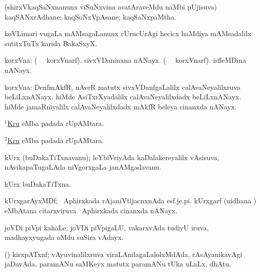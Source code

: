 \bentry
{}
\gl{\nA}
\bmng
(shirxVkaqSaNxnanunx viSuNxvina avatAraveMdu naMbi pUjisuva) kaqSANxrAdhane; kaqSoNxVpAsane; kaqSaNxpaMtha. 
\emng
\eentry

\bentry
{}
\gl{\nA}
\bmng
koVLimari \mo vugaLa mAMsagaLanunx cUrucUrAgi hecicx haMdiya mAMsadalilx sutitxTuTx karida BakaSxyX. 
\emng
\eentry

\bentry
{}
\gl{\nA}
\bmng
korxVna: 
\banum
{} (\bava\  \ucAcx\ korxVnarf). sivxVDaninxna nANayx. 
 (\bava\  \ucAcx\ korxVnarf). isfleMDina nANayx. 
\eanum
\emng
\eentry


\bentry
{}
\gl{\nA}
\bmng
korxVna: 
\banum
{} DenfmAkfR, nAveR matutx sivxVDanfgaLalilx calAvaNeyalilxruva beLiLxnANayx. 
 hiMde AsiTxrXyadalilx calAvaNeyalilxdadx beLiLxnANayx. 
 hiMde jamaRniyalilx calAvaNeyalilxdadx  mAkfR beleya cinanxda nANayx. 
\eanum
\emng
\eentry

\bentry
{}
\gl{\nA}
\bmng
 \hyperlink{Kru(1)}{$^1$Kru} eMba padada rUpAMtara. 
\emng
\eentry

\bentry
{}
\gl{\gu}
\bmng
 \hyperlink{Kru(2)}{$^2$Kru} eMba padada rUpAMtara. 
\emng
\eentry

\bentry
{}
\gl{\nA}
\bmng
kUrx (buDakaTiTxnavanu); leYbiVriyAda kaDalakereyalilx vAsisuva, nAvikapaTugaLAda niVgorxgaLa janAMgadavanu. 
\emng
\eentry

\bentry
{}
\gl{\gu}
\bmng
kUrx buDakaTiTxna. 
\emng
\eentry

\bentry
{}
\gl{\nA}
\bmng
kUrxgarAyxMDf; \da\ Aphirxkada rAjaniVtijacnxnAda esf.je.pi. kUrxgarf (nidhana ) eMbAtana citarxviruva \da\ Aphirxkada cinanxda nANayx. 
\emng
\eentry

\bentry
{}
\gl{\nA}
\bmng
joVDi piVpi kahaLe; joVDi piVpigaLU, vakarxvAda tudiyU iruva, madhayxyugada oMdu suSira vAdayx.   
\emng
\eentry

\bentry
{}
\gl{\nA}
\bmng
(\ravi) kirxpATxnf; vAyuvinalilxruva viraLAnilagaLalolxMdAda, rAsAyanikavAgi jaDavAda, paramANu saMKeyx  matutx paramANu tUka  uLaLx, dhAtu. 
\emng
\eentry

